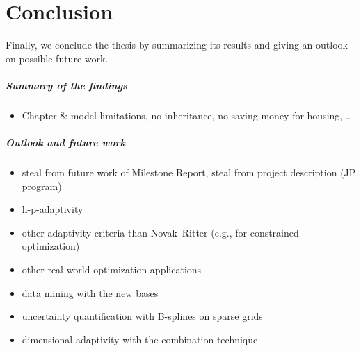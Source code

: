\chapter{Conclusion}
\label{chap:90conclusion}

\noindent
Finally, we conclude the thesis by summarizing its results
and giving an outlook on possible future work.

\paragraph{Summary of the findings}


\begin{itemize}
  \item
  Chapter 8: model limitations, no inheritance,
  no saving money for housing, \dots
\end{itemize}

\dummytext[6]{}

\paragraph{Outlook and future work}


\begin{itemize}
  \item
  steal from future work of Milestone Report,
  steal from project description (JP program)
  
  \item
  h-p-adaptivity
  
  \item
  other adaptivity criteria than Novak--Ritter
  (e.g., for constrained optimization)
  
  \item
  other real-world optimization applications
  
  \item
  data mining with the new bases
  
  \item
  uncertainty quantification with B-splines on sparse grids
  
  \item
  dimensional adaptivity with the combination technique
\end{itemize}

\dummytext[6]{}

\cleardoublepage
